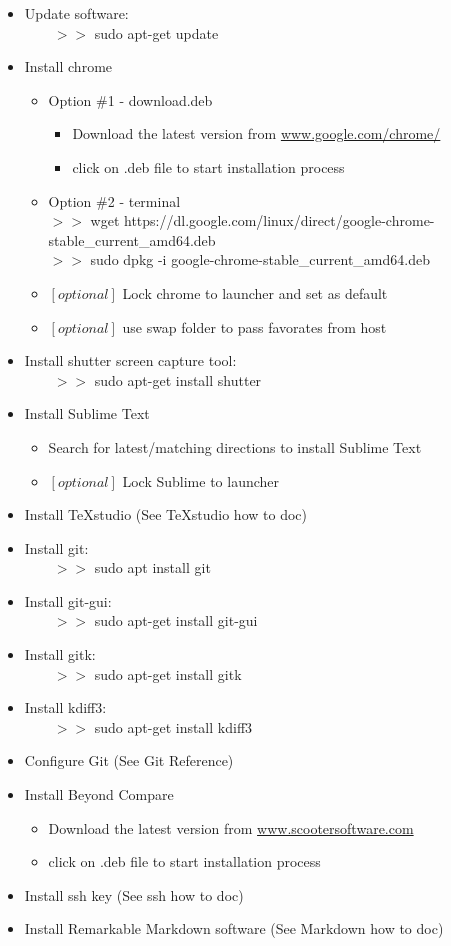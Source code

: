\documentclass{scrartcl}
\begin{document}
\begin{itemize}
	\item Update software: \\ $\qquad >>$ sudo apt-get update
	\item Install chrome
	\begin{itemize}
		\item Option \#1 - download.deb
		\begin{itemize}
			\item Download the latest version from \href{https://www.google.com/chrome/}{www.google.com/chrome/}
			\item click on .deb file to start installation process
		\end{itemize}
		\item Option \#2 - terminal
			\\ $>>$ wget https://dl.google.com/linux/direct/google-chrome-stable\_current\_amd64.deb
			\\ $>>$ sudo dpkg -i google-chrome-stable\_current\_amd64.deb
		\item $[optional]$ Lock chrome to launcher and set as default
		\item $[optional]$ use swap folder to pass favorates from host
	\end{itemize}

	\item Install shutter screen capture tool: \\ $\qquad >>$ sudo apt-get install shutter
	\item Install Sublime Text
	\begin{itemize}
		\item Search for latest/matching directions to install Sublime Text
		\item $[optional]$ Lock Sublime to launcher
	\end{itemize}
	\item Install TeXstudio (See TeXstudio how to doc)
	\item Install git: \\ $\qquad >>$ sudo apt install git
	\item Install git-gui: \\ $\qquad >>$ sudo apt-get install git-gui
	\item Install gitk: \\ $\qquad >>$ sudo apt-get install gitk
	\item Install kdiff3: \\ $\qquad >>$ sudo apt-get install kdiff3
	\item Configure Git (See Git Reference)
	\item Install Beyond Compare
	\begin{itemize}
		\item Download the latest version from \href{https://www.scootersoftware.com/download.php}{www.scootersoftware.com}
		\item click on .deb file to start installation process
	\end{itemize}
	\item Install ssh key (See ssh how to doc)
	\item Install Remarkable Markdown software (See Markdown how to doc)
	

\end{itemize}
\end{document}
